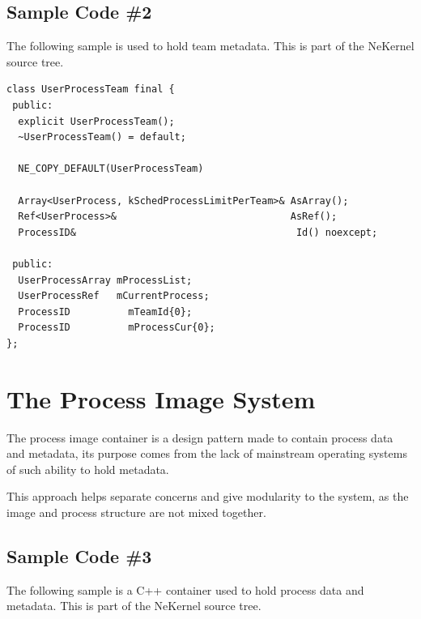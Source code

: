 \documentclass{article}
\begin{document}
\subsection{Sample Code \#2}

{The following sample is used to hold team metadata.} {This is part of the NeKernel source tree.}

\begin{verbatim}
class UserProcessTeam final {
 public:
  explicit UserProcessTeam();
  ~UserProcessTeam() = default;

  NE_COPY_DEFAULT(UserProcessTeam)

  Array<UserProcess, kSchedProcessLimitPerTeam>& AsArray();
  Ref<UserProcess>&                              AsRef();
  ProcessID&                                      Id() noexcept;

 public:
  UserProcessArray mProcessList;
  UserProcessRef   mCurrentProcess;
  ProcessID          mTeamId{0};
  ProcessID          mProcessCur{0};
};

\end{verbatim}

\section{The Process Image System}

{The process image container is a design pattern made to contain process data and metadata, its purpose comes from the lack of mainstream operating systems of such ability to hold metadata.}

{This approach helps separate concerns and give modularity to the system, as the image and process structure are not mixed together.}

\subsection{Sample Code \#3}

{The following sample is a C++ container used to hold process data and metadata.} {This is part of the NeKernel source tree.}
\end{document}

